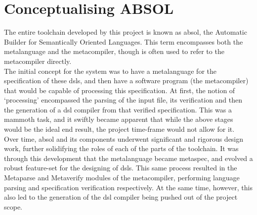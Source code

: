 
\section{Conceptualising ABSOL} %
\label{sec:conceptualising_absol}
The entire toolchain developed by this project is known as \acrshort{absol}, the Automatic Builder for Semantically Oriented Languages. 
This term encompasses both the metalanguage and the metacompiler, though is often used to refer to the metacompiler directly.\\

The initial concept for the system was to have a metalanguage for the specification of these \glspl{dsl}, and then have a software program (the metacompiler) that would be capable of processing this specification.
At first, the notion of `processing' encompassed the parsing of the input file, its verification and then the generation of a \gls{dsl} compiler from that verified specification. 
This was a mammoth task, and it swiftly became apparent that while the above stages would be the ideal end result, the project time-frame would not allow for it.\\

Over time, \gls{absol} and its components underwent significant and rigorous design work, further solidifying the roles of each of the parts of the toolchain.
It was through this development that the metalanguage became \gls{metaspec}, and evolved a robust feature-set for the designing of \glspl{dsl}.
This same process resulted in the Metaparse and Metaverify modules of the metacompiler, performing language parsing and specification verification respectively.
At the same time, however, this also led to the generation of the \gls{dsl} compiler being pushed out of the project scope.


